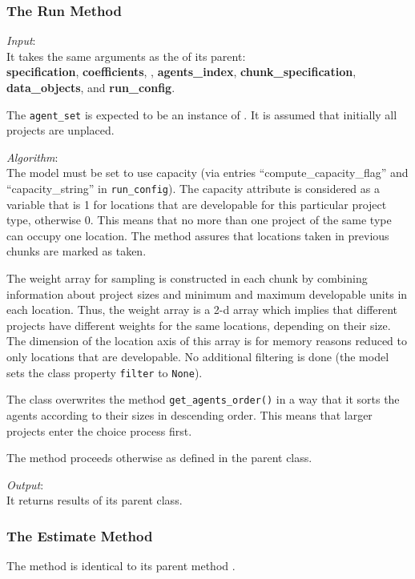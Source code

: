 \subsubsection{The Run Method}
%
{\it Input}:\\[1mm]
It takes the same arguments as the  of its parent: \\
{\bf specification}, {\bf coefficients}, , {\bf agents_index},
{\bf chunk_specification}, {\bf data_objects}, and {\bf run_config}.

The \verb|agent_set| is expected to be an instance of
. It is assumed that initially all projects are
unplaced.

{\it Algorithm}:\\[1mm]
The model \modelsindex must be set to use capacity (via entries ``compute_capacity_flag''
and ``capacity_string'' in \verb|run_config|).  The capacity attribute \attributesindex is
considered as a variable \variablesindex that is 1 for locations that are developable for this
particular project type, otherwise 0. This means that no more than one project
of the same type can occupy one location. The method
 assures that locations taken in previous
chunks are marked as taken.

The weight array for sampling is constructed in each chunk by combining
information about project sizes and minimum and maximum developable units in
each location.  Thus, the weight array is a 2-d array which implies that
different projects have different weights for the same locations, depending on
their size. The dimension of the location axis of this array is for memory
reasons reduced to only locations that are developable. No additional
filtering is done (the model \modelsindex sets the class property \verb|filter| to
\verb|None|).

The class overwrites the method \verb|get_agents_order()| in a way that it
sorts the agents according to their sizes in descending order. This means that
larger projects enter the choice process first.

The  method proceeds otherwise as defined in the parent class.

{\it Output}:~\\[1mm]
It returns results of its parent class.

\subsubsection{The Estimate Method}
%
The  method is identical to its parent method
.


